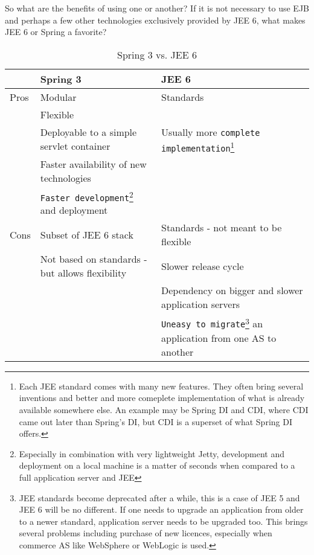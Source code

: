	So what are the benefits of using one or another? If it is not necessary to use EJB and perhaps a few other
	technologies exclusively provided by JEE 6, what makes JEE 6 or Spring a favorite?

	\begin{table}[h]\centering
	 	\begin{minipage}{12.9cm}
		\begin{tabular}{p{1cm}|p{5.2cm}|p{5.2cm}}
		\hline
		& Spring 3 & JEE 6\\
		\hline
		Pros & Modular & Standards \\
			 & Flexible &  \\
			 & Deployable to a simple servlet container & Usually more \verb|complete implementation|\footnote{Each JEE standard
			 comes with many new features. They often bring several inventions and better and more comeplete
			 implementation of what is already available somewhere else. An example may be Spring DI and CDI, where CDI
			 came out later than Spring's DI, but CDI is a superset of what Spring DI offers.}
			 \\
			 & Faster availability of new technologies &  \\
			 & \verb|Faster development|\footnote{Especially in combination with very lightweight Jetty, development and
			 deployment on a local machine is a matter of seconds when compared to a full application server and JEE} and
			 deployment & \\
		\hline
		Cons & Subset of JEE 6 stack & Standards - not meant to be flexible \\
			 & Not based on standards - but allows flexibility & Slower release cycle \\
			 & & Dependency on bigger and slower application servers \\
			 & & \verb|Uneasy to migrate|\footnote{JEE standards become deprecated after a while, this is a case of JEE 5 and
			 JEE 6 will be no different. If one needs to upgrade an application from older to a newer standard, application
			 server needs to be upgraded too. This brings several problems including purchase of new licences, especially when
			 commerce AS like WebSphere or WebLogic is used.} an application from one AS to another
			 \\
		\end{tabular}
	    \renewcommand{\footnoterule}{}
	    \end{minipage}
	\caption{Spring 3 vs. JEE 6}
	\label{tab:jee6_vs_spring_3}
	\end{table}
	
